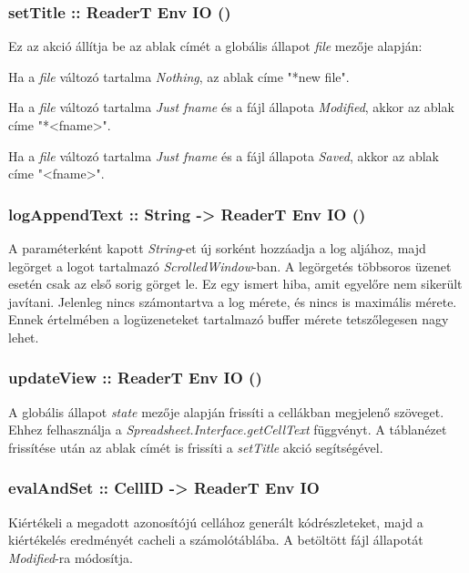 \subsubsection{setTitle :: ReaderT Env IO ()}

Ez az akció állítja be az ablak címét a globális állapot \textit{file} mezője alapján:
\begin{compactenum}
	\item Ha a \textit{file} változó tartalma \textit{Nothing}, az ablak címe "*new file".
	\item Ha a \textit{file} változó tartalma \textit{Just fname} és a fájl állapota \textit{Modified}, akkor az ablak címe "*<fname>".
	\item Ha a \textit{file} változó tartalma \textit{Just fname} és a fájl állapota \textit{Saved}, akkor az ablak címe "<fname>".
\end{compactenum}

\subsubsection{logAppendText :: String -> ReaderT Env IO ()}

A paraméterként kapott \textit{String}-et új sorként hozzáadja a log aljához, majd legörget a logot tartalmazó \textit{ScrolledWindow}-ban. A legörgetés többsoros üzenet esetén csak az első sorig görget le. Ez egy ismert hiba, amit egyelőre nem sikerült javítani. Jelenleg nincs számontartva a log mérete, és nincs is maximális mérete. Ennek értelmében a logüzeneteket tartalmazó buffer mérete tetszőlegesen nagy lehet.

\subsubsection{updateView :: ReaderT Env IO ()}

A globális állapot \textit{state} mezője alapján frissíti a cellákban megjelenő szöveget. Ehhez felhasználja a \textit{Spreadsheet.Interface.getCellText} függvényt. A táblanézet frissítése után az ablak címét is frissíti a \textit{setTitle} akció segítségével.

\subsubsection{evalAndSet :: CellID -> ReaderT Env IO}

Kiértékeli a megadott azonosítójú cellához generált kódrészleteket, majd a kiértékelés eredményét cacheli a számolótáblába. A betöltött fájl állapotát \textit{Modified}-ra módosítja.

